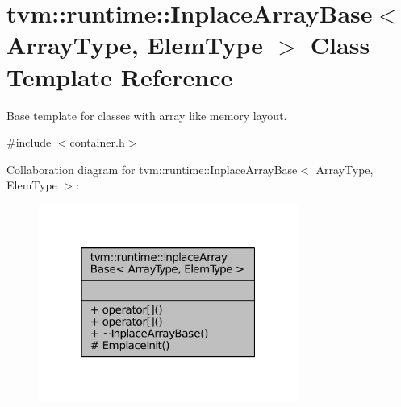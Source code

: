 \hypertarget{classtvm_1_1runtime_1_1InplaceArrayBase}{}\section{tvm\+:\+:runtime\+:\+:Inplace\+Array\+Base$<$ Array\+Type, Elem\+Type $>$ Class Template Reference}
\label{classtvm_1_1runtime_1_1InplaceArrayBase}


Base template for classes with array like memory layout.  




{\ttfamily \#include $<$container.\+h$>$}



Collaboration diagram for tvm\+:\+:runtime\+:\+:Inplace\+Array\+Base$<$ Array\+Type, Elem\+Type $>$\+:
\nopagebreak
\begin{figure}[H]
\begin{center}
\leavevmode
\includegraphics[width=241pt]{classtvm_1_1runtime_1_1InplaceArrayBase__coll__graph}
\end{center}
\end{figure}
